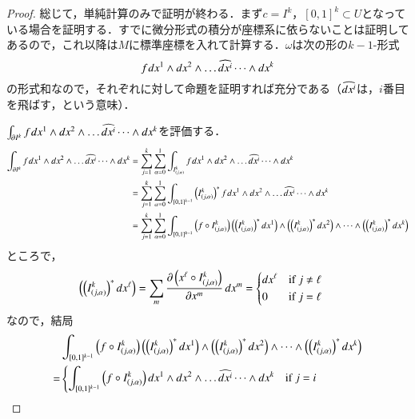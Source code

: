 \begin{proof}
総じて，単純計算のみで証明が終わる．まず$c = I^k$，$[0,1]^k \subset U$となっている場合を証明する．すでに微分形式の積分が座標系に依らないことは証明してあるので，これ以降は$M$に標準座標を入れて計算する．$\omega$は次の形の$k-1$-形式
\begin{equation}
f_{} \mathop{}\!d x^1 \wedge \mathop{}\!d x^2 \wedge \dots \widehat{\mathop{}\!d x^i} \dots \wedge \mathop{}\!d x^k
\end{equation}の形式和なので，それぞれに対して命題を証明すれば充分である（$\widehat{\mathop{}\!d x^i}$は，$i$番目を飛ばす，という意味）．

$\int_{\partial I^k} f_{} \mathop{}\!d x^1 \wedge \mathop{}\!d x^2 \wedge \dots \widehat{\mathop{}\!d x^i} \dots \wedge \mathop{}\!d x^k$を評価する．
\begin{align}
\int_{\partial I^k} f_{} \dif x^1 \wedge \dif x^2 \wedge \dots \widehat{\dif x^i} \dots \wedge \dif x^k
&= \sum_{j = 1}^k \sum_{\alpha = 0}^1 \int_{I^k_{(j,\alpha)}} f_{} \dif x^1 \wedge \dif x^2 \wedge \dots \widehat{\dif x^i} \dots \wedge \dif x^k \\
&= \sum_{j = 1}^k \sum_{\alpha = 0}^1 \int_{[0,1]^{k-1}} \left(I^k_{(j,\alpha)}\right)^* f_{} \dif x^1 \wedge \dif x^2 \wedge \dots \widehat{\dif x^i} \dots \wedge \dif x^k \\
&= \sum_{j = 1}^k \sum_{\alpha = 0}^1 \int_{[0,1]^{k-1}} \left(f \circ I^k_{(j,\alpha)}\right) \left(\left(I^k_{(j,\alpha)}\right)^*\dif x^1\right) \wedge \left(\left(I^k_{(j,\alpha)}\right)^*\dif x^2\right) \wedge \dots \wedge \left(\left(I^k_{(j,\alpha)}\right)^*\dif x^k\right)  \\
\end{align}
ところで，
\begin{align}
\left(\left(I^k_{(j,\alpha)}\right)^*\dif x^\ell \right) &= \sum_m \frac{\partial \left(x^{\ell} \circ I^k_{(j, \alpha)}\right)}{\partial x^m} \dif x^m
=\begin{dcases*}
    \dif x^\ell & if $j\neq\ell$ \\
    0 & if $j = \ell$
  \end{dcases*}
\end{align}なので，結局
\begin{align}
&\int_{[0,1]^{k-1}} \left(f \circ I^k_{(j,\alpha)}\right) \left(\left(I^k_{(j,\alpha)}\right)^*\dif x^1\right) \wedge \left(\left(I^k_{(j,\alpha)}\right)^*\dif x^2\right) \wedge \dots \wedge \left(\left(I^k_{(j,\alpha)}\right)^*\dif x^k\right) \\
=& \begin{dcases*}
    \int_{[0,1]^{k-1}} \left(f \circ I^k_{(j,\alpha)}\right) \dif x^1 \wedge \dif x^2 \wedge \dots \widehat{\dif x^i} \dots \wedge \dif x^k & if $j = i$ \\

\end{dcases*}
\end{align}
\end{proof}

